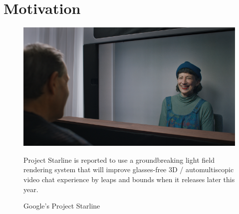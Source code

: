 \section{Motivation}\label{sec:motivation} 

\begin{figure}[!h]
    \includegraphics[width=1\columnwidth]{figures/google-starline-416.png}
    \caption{Google's Project Starline~\cite{}}
    \label{fig:google-starline}
    {\small Project Starline is reported to use a groundbreaking light field rendering system that will improve glasses-free 3D / automultiscopic video chat experience by leaps and bounds when it releases later this year.}
\end{figure}

